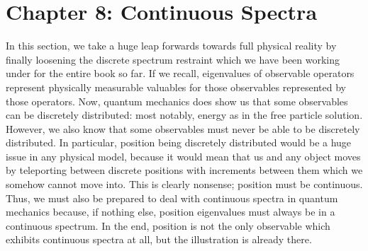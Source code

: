 \chapter{Chapter 8: Continuous Spectra}
In this section, we take a huge leap forwards towards full physical reality by finally loosening the discrete spectrum restraint which we have been working under for the entire book so far. If we recall, eigenvalues of observable operators represent physically measurable valuables for those observables represented by those operators. Now, quantum mechanics does show us that some observables can be discretely distributed: most notably, energy as in the free particle solution. However, we also know that some observables must never be able to be discretely distributed. In particular, position being discretely distributed would be a huge issue in any physical model, because it would mean that us and any object moves by teleporting between discrete positions with increments between them which we somehow cannot move into. This is clearly nonsense; position must be continuous. Thus, we must also be prepared to deal with continuous spectra in quantum mechanics because, if nothing else, position eigenvalues must always be in a continuous spectrum. In the end, position is not the only observable which exhibits continuous spectra at all, but the illustration is already there.

